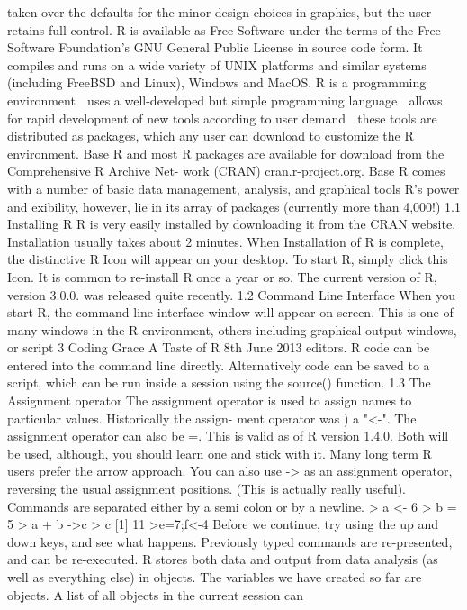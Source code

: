 taken over the defaults for the minor design choices in graphics, but the user retains full control.
R is available as Free Software under the terms of the Free Software Foundation's GNU General
Public License in source code form. It compiles and runs on a wide variety of UNIX platforms
and similar systems (including FreeBSD and Linux), Windows and MacOS.
R is a programming environment
 uses a well-developed but simple programming language
 allows for rapid development of new tools according to user demand
 these tools are distributed as packages, which any user can download to customize the R
environment.
Base R and most R packages are available for download from the Comprehensive R Archive Net-
work (CRAN) cran.r-project.org. Base R comes with a number of basic data management,
analysis, and graphical tools R's power and 
exibility, however, lie in its array of packages
(currently more than 4,000!)
1.1 Installing R
R is very easily installed by downloading it from the CRAN website. Installation usually takes
about 2 minutes. When Installation of R is complete, the distinctive R Icon will appear on your
desktop. To start R, simply click this Icon. It is common to re-install R once a year or so. The
current version of R, version 3.0.0. was released quite recently.
1.2 Command Line Interface
When you start R, the command line interface window will appear on screen. This is one
of many windows in the R environment, others including graphical output windows, or script
3
Coding Grace A Taste of R 8th June 2013
editors. R code can be entered into the command line directly. Alternatively code can be saved
to a script, which can be run inside a session using the source() function.
1.3 The Assignment operator
The assignment operator is used to assign names to particular values. Historically the assign-
ment operator was ) a "<-". The assignment operator can also be =. This is valid as of R
version 1.4.0.
Both will be used, although, you should learn one and stick with it. Many long term R
users prefer the arrow approach. You can also use -> as an assignment operator, reversing the
usual assignment positions. (This is actually really useful). Commands are separated either by
a semi colon or by a newline.
> a <- 6
> b = 5
> a + b ->c
> c
[1] 11
>e=7;f<-4
Before we continue, try using the up and down keys, and see what happens. Previously
typed commands are re-presented, and can be re-executed.
R stores both data and output from data analysis (as well as everything else) in objects.
The variables we have created so far are objects. A list of all objects in the current session can
